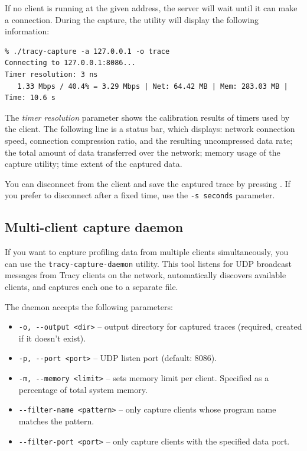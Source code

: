 \documentclass[hidelinks,titlepage,a4paper,twoside]{article}
\begin{document}
If no client is running at the given address, the server will wait until it can make a connection. During the capture, the utility will display the following information:

\begin{verbatim}
% ./tracy-capture -a 127.0.0.1 -o trace
Connecting to 127.0.0.1:8086...
Timer resolution: 3 ns
   1.33 Mbps / 40.4% = 3.29 Mbps | Net: 64.42 MB | Mem: 283.03 MB | Time: 10.6 s
\end{verbatim}

The \emph{timer resolution} parameter shows the calibration results of timers used by the client. The following line is a status bar, which displays: network connection speed, connection compression ratio, and the resulting uncompressed data rate; the total amount of data transferred over the network; memory usage of the capture utility; time extent of the captured data.

You can disconnect from the client and save the captured trace by pressing . If you prefer to disconnect after a fixed time, use the \texttt{-s seconds} parameter.

\subsection{Multi-client capture daemon}

If you want to capture profiling data from multiple clients simultaneously, you can use the \texttt{tracy-capture-daemon} utility. This tool listens for UDP broadcast messages from Tracy clients on the network, automatically discovers available clients, and captures each one to a separate file.

The daemon accepts the following parameters:

\begin{itemize}
\item \texttt{-o, -{}-output <dir>} -- output directory for captured traces (required, created if it doesn't exist).
\item \texttt{-p, -{}-port <port>} -- UDP listen port (default: 8086).
\item \texttt{-m, -{}-memory <limit>} -- sets memory limit per client. Specified as a percentage of total system memory.
\item \texttt{-{}-filter-name <pattern>} -- only capture clients whose program name matches the pattern.
\item \texttt{-{}-filter-port <port>} -- only capture clients with the specified data port.
\end{itemize}
\end{document}
